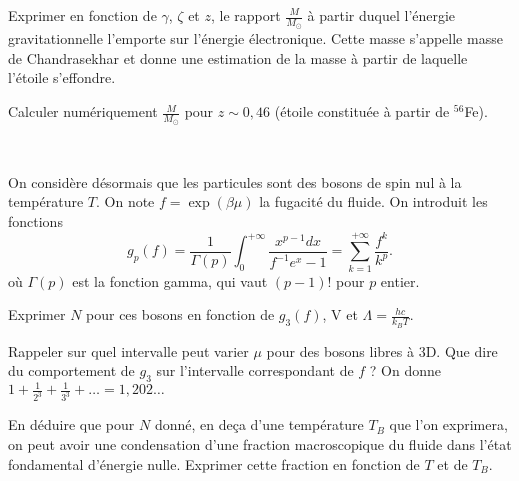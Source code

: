 \question Exprimer  en fonction de $\gamma$, $\zeta$ et $z$, le rapport $\frac{M}{M_{\odot}}$ à partir duquel l'énergie gravitationnelle l'emporte sur l'énergie électronique. Cette masse s'appelle masse de Chandrasekhar et donne une estimation de la masse à partir de laquelle  l'étoile s'effondre.

\question Calculer numériquement $\frac{M}{M_{\odot}}$ pour $z \sim 0,46$ (étoile constituée à partir de $^{56}$Fe).

\ 

On considère désormais que les particules sont des bosons de spin nul à la température $T$.
On note $f=\exp(\beta \mu)$ la fugacité du fluide. On introduit les fonctions 
\begin{equation*}
    g_p(f)=\frac{1}{\Gamma (p)} \int_0^{+\infty}\frac{x^{p-1} dx}{f^{-1}e^x-1}=\sum_{k=1}^{+\infty} \frac{f^k}{k^p}.
\end{equation*}
où $\Gamma (p)$ est la fonction gamma, qui vaut $(p-1)!$ pour $p$ entier.

\question Exprimer $N$ pour ces bosons en fonction de $g_3(f)$, V et $\Lambda=\frac{hc}{k_BT}$. 

\question Rappeler sur quel intervalle peut varier $\mu$ pour des bosons libres à 3D. Que dire du comportement de $g_3$ sur l'intervalle correspondant de $f$ ?  On donne $1+\frac{1}{2^3}+\frac{1}{3^3}+ \ldots =1,202\dots$

\question En déduire que pour $N$ donné, en deça d'une température $T_B$ que l'on exprimera, on peut avoir une condensation d'une fraction macroscopique du fluide dans l'état fondamental d'énergie nulle. Exprimer cette fraction en fonction de $T$ et de $T_B$.
